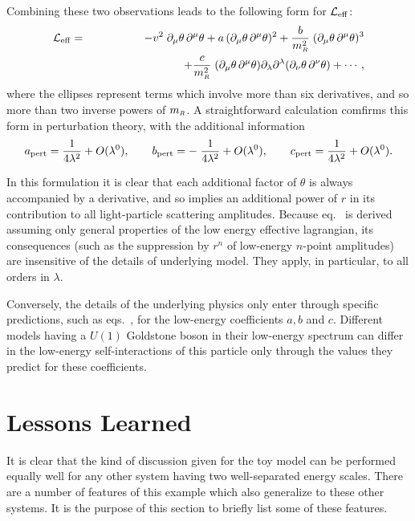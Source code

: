 Combining these two observations leads to the following
form for ${\cal L}_{\rm eff}$:
%
\begin{eqnarray}
\label{Leffform}
{\cal L}_{\rm eff} &=& - v^2 \; \partial_\mu \theta \, \partial^\mu \theta
+ a \, (\partial_\mu \theta \, \partial^\mu \theta)^2 
+ {b \over m_{\scriptscriptstyle R}^2} \; (\partial_\mu \theta \, \partial^\mu \theta)^3
\nonumber\\
&& \qquad\qquad\qquad\qquad
+ {c \over m_{\scriptscriptstyle R}^2} \; (\partial_\mu \theta \, \partial^\mu \theta)
\partial_\lambda \partial^\lambda
(\partial_\nu \theta \, \partial^\nu \theta) + \cdots,
\end{eqnarray}
%
where the ellipses represent terms which involve more than
six derivatives, and so more than two inverse powers of 
$m_{\scriptscriptstyle R}$. A straightforward calculation comfirms this form in 
perturbation theory, with the additional information
%
\begin{equation}
\label{treecoeffs}
a_{\rm pert} = {1 \over 4 \lambda^2} + O(\lambda^0),
\qquad b_{\rm pert} = - \; {1 \over 4 \lambda^2} + O(\lambda^0),
\qquad c_{\rm pert} = {1 \over 4 \lambda^2}  + O(\lambda^0).
\end{equation}

In this formulation it is clear that each additional factor of 
$\theta$ is always accompanied by a derivative, 
and so implies an additional power of $r$ in its contribution 
to all light-particle scattering amplitudes. Because 
eq.~ is derived assuming only general properties of the
low energy effective lagrangian, its consequences (such as the
suppression by $r^n$ of low-energy $n$-point amplitudes) are
insensitive of the details of underlying model. They apply, in 
particular, to all orders in $\lambda$.

Conversely, the details of the underlying physics only enter 
through specific predictions, such as eqs.~, 
for the low-energy coefficients $a,b$ and $c$. Different
models having a $U(1)$ Goldstone boson in their low-energy
spectrum can differ in the low-energy self-interactions of this
particle only through the values they predict for these
coefficients. 

\section{Lessons Learned}

It is clear that the kind of discussion given for the
toy model can be performed equally well for any other 
system having two well-separated energy scales.
There are a number of features of this example which
also generalize to these other systems. It is the purpose
of this section to briefly list some of these features.

